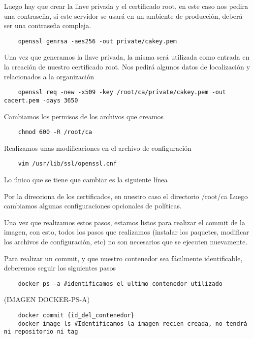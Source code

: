 \noindent Luego hay que crear la llave privada y el certificado root, en este caso nos pedira una contraseña, si este servidor 
se usará en un ambiente de producción, deberá ser una contraseña compleja.

\begin{verbatim}
    openssl genrsa -aes256 -out private/cakey.pem

\end{verbatim}

\noindent Una vez que generamos la llave privada, la misma será utilizada como entrada en la creación de 
nuestro certificado root. Nos pedirá algunos datos de localización y relacionados a la 
organización

\begin{verbatim}
    openssl req -new -x509 -key /root/ca/private/cakey.pem -out cacert.pem -days 3650
\end{verbatim}

\noindent Cambiamos los permisos de los archivos que creamos
\begin{verbatim}
    chmod 600 -R /root/ca
\end{verbatim}

\noindent Realizamos unas modificaciones en el archivo de configuración
\begin{verbatim}
    vim /usr/lib/ssl/openssl.cnf
\end{verbatim}

 
Lo único que se tiene que cambiar es la siguiente línea 
 
Por la direcciona de los certificados, en nuestro caso el directorio /root/ca
Luego cambiamos algunas configuraciones opcionales de políticas.

Una vez que realizamos estos pasos, estamos listos para realizar el commit de la imagen, con esto,
todos los pasos que realizamos (instalar los paquetes, modificar los archivos de configuración, etc)
no son necesarios que se ejecuten nuevamente.

Para realizar un commit, y que nuestro contenedor sea fácilmente identificable, deberemos seguir 
los siguientes pasos

\begin{verbatim}
    docker ps -a #identificamos el ultimo contenedor utilizado
\end{verbatim}
 
(IMAGEN DOCKER-PS-A)

\begin{verbatim}
    docker commit {id_del_contenedor} 
    docker image ls #Identificamos la imagen recien creada, no tendrá ni repositorio ni tag
\end{verbatim}

